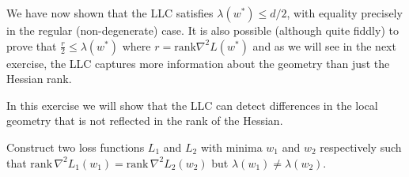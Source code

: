 \documentclass[11pt]{article}
\newcommand{\rank}{\mathrm{rank}}
\begin{document}
We have now shown that the LLC satisfies $\lambda(w^*) \leq d/2$, with equality precisely in the regular (non-degenerate) case.
 It is also possible (although quite fiddly) to prove that $ \frac{r}{2} \leq \lambda(w^*)$ where $r= \rank \nabla^2L(w^*)$ and as we will see in the next exercise, the LLC captures more information about the geometry than just the Hessian rank.

\begin{exercise}
\label{ex:LLC-hessian-rank}
    In this exercise we will show that the LLC can detect differences in the local geometry that is not reflected in the rank of the Hessian.  
    
    Construct two loss functions $L_1$ and $L_2$ with minima $w_1$ and $w_2$ respectively such that $\rank \, \nabla^2L_1(w_1) = \rank \, \nabla^2L_2(w_2)$ but $\lambda(w_1) \neq \lambda(w_2)$.
\end{exercise}
\end{document}

